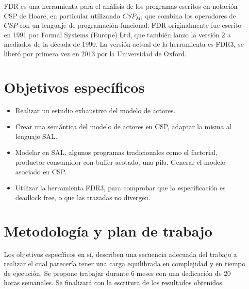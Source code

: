 \documentclass{article}
\begin{document}
FDR es una herramienta para el análisis de los programas escritos en notación CSP de Hoare, en particular utilizando $CSP_M$, que combina los operadores de $CSP$ con un lenguaje de programación funcional. FDR originalmente fue escrito en 1991 por Formal Systems (Europe) Ltd, que también lanzo la versión 2 a mediados de la década de 1990. La versión actual de la herramienta es FDR3, se liberó por primera vez en 2013 por la Universidad de Oxford.

\section{Objetivos específicos}

\begin{itemize}

  \item Realizar un estudio exhaustivo del modelo de actores. 
  \item Crear una semántica del modelo de actores en CSP, adaptar la misma al lenguaje SAL.
  \item Modelar en SAL, algunos programas tradicionales como el factorial, productor consumidor con buffer acotado, una pila. Generar el modelo asociado en CSP.
  \item Utilizar la  herramienta FDR3, para comprobar que la especificación es deadlock free, o que las trazadas no divergen.  

\end{itemize}


\section{Metodología y plan de trabajo}

Los objetivos específicos en sí, describen una secuencia adecuada del trabajo a realizar el cual parecería tener una carga equilibrada en complejidad y en tiempo de ejecución. Se propone trabajar durante 6 meses con una dedicación de 20 horas semanales. Se finalizará con la escritura de los resultados obtenidos.

{}

\end{document}
